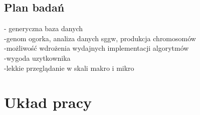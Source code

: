 \subsection*{Plan badań}
- generyczna baza danych \\
-genom ogorka, analiza danych sggw, produkcja chromosomów \\
-możliwość wdrożenia wydajnych implementacji algorytmów \\
-wygoda uzytkownika \\
-lekkie przeglądanie w skali makro i mikro \\

\section{Układ pracy}
\label{section:uklad_pracy}

